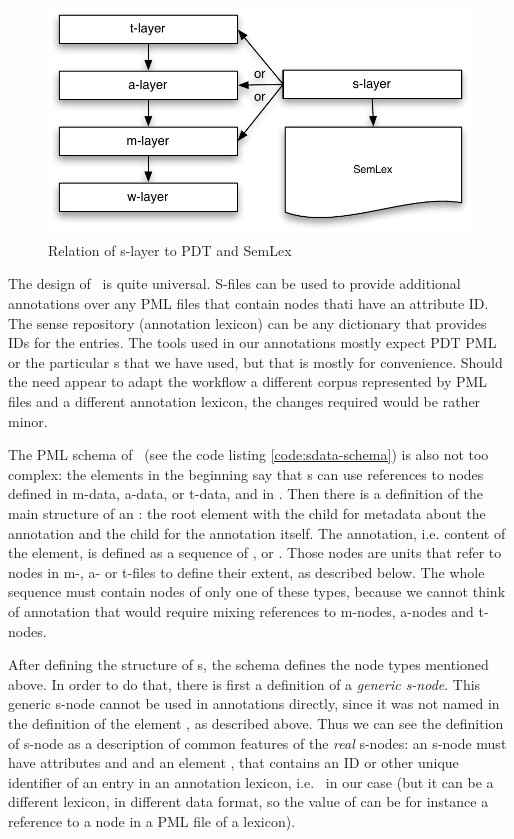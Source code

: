 \begin{figure}[htbp]
   \centering
   \includegraphics[scale=.5]{images/layers-with-s-layer.pdf} %
   \caption{Relation of s-layer to PDT and SemLex}
    \label{fig:s-layer}
\end{figure}


The design of \sdata\ is quite universal. S-files can be used to provide additional annotations over any PML files that contain nodes thati have an attribute ID. The sense repository (annotation lexicon) can be any dictionary that provides IDs for the entries. The tools used in our annotations mostly expect PDT PML or the particular \sf{}s that we have used, but that is mostly for convenience. Should the need appear to adapt the workflow a different corpus represented by PML files and a different annotation lexicon, the changes required would be rather minor.

The PML schema of \sdata\ (see the code listing \ref{code:sdata-schema}) is also not too complex: the elements  in the beginning say that \sf{}s can use references to nodes defined in m-data, a-data, or t-data, and in \semlex. Then there is a definition of the main structure of an \sf: the root element  with the child  for metadata about the annotation and the child  for the annotation itself. The annotation, i.e. content of the  element, is defined as a sequence of , or . Those nodes are units that refer to nodes in m-, a- or t-files to define their extent, as described below. The whole sequence must contain nodes of only one of these types, because we cannot think of annotation that would require mixing references to m-nodes, a-nodes and t-nodes.

After defining the structure of \sf{}s, the schema defines the node types mentioned above. In order to do that, there is first a definition of a \emph{generic s-node}. This generic s-node cannot be used in annotations directly, since it was not named in the definition of the element , as described above. Thus we can see the definition of s-node as a description of common features of the \emph{real} s-nodes: an s-node must have attributes  and  and an element , that contains an ID or other unique identifier of an entry in an annotation lexicon, i.e. \semlex\ in our case (but it can be a different lexicon, in different data format, so the value of  can be for instance a reference to a node in a PML file of a lexicon). 

